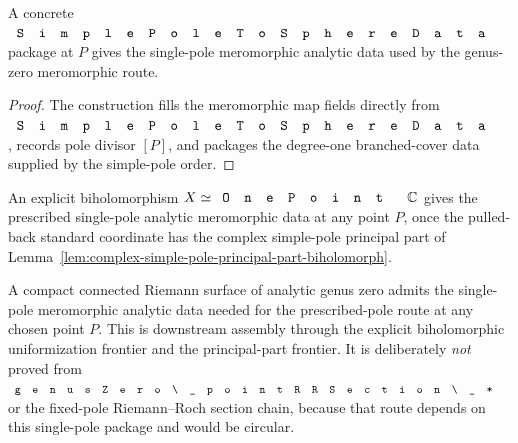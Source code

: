 \begin{lemma}
\label{lem:single-pole-analytic-data-of-simple-pole-to-sphere}
A concrete \(\code{SimplePoleToSphereData}\) package at \(P\) gives the
single-pole meromorphic analytic data used by the genus-zero meromorphic route.
\leanok
\end{lemma}
\begin{proof}\leanok
The construction fills the meromorphic map fields directly from
\(\code{SimplePoleToSphereData}\), records pole divisor \([P]\), and packages
the degree-one branched-cover data supplied by the simple-pole order.
\end{proof}

\begin{lemma}
\label{lem:single-pole-analytic-data-of-biholomorph}
An explicit biholomorphism \(X\simeq\code{OnePoint}\,\C\) gives the prescribed
single-pole analytic meromorphic data at any point \(P\), once the pulled-back
standard coordinate has the complex simple-pole principal part of
Lemma~\ref{lem:complex-simple-pole-principal-part-biholomorph}.
\end{lemma}

\begin{theorem}
\label{thm:genus-zero-single-pole-analytic-data}
A compact connected Riemann surface of analytic genus zero admits the
single-pole meromorphic analytic data needed for the prescribed-pole route at
any chosen point \(P\).
This is downstream assembly through the explicit biholomorphic uniformization
frontier and the principal-part frontier. It is deliberately \emph{not} proved
from \(\code{genusZero\_pointRRSection\_*}\) or the fixed-pole
Riemann--Roch section chain, because that route depends on this single-pole
package and would be circular.
\end{theorem}

